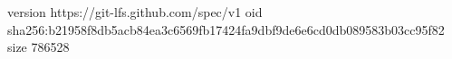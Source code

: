 version https://git-lfs.github.com/spec/v1
oid sha256:b21958f8db5acb84ea3c6569fb17424fa9dbf9de6e6cd0db089583b03cc95f82
size 786528
